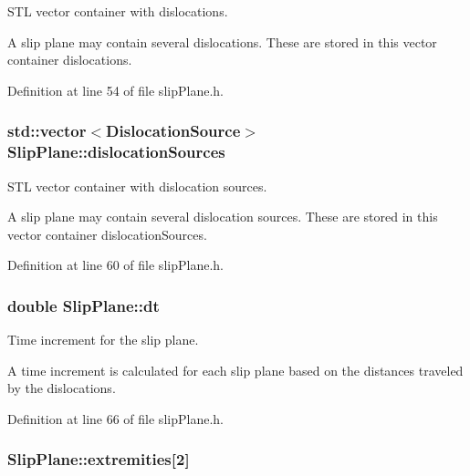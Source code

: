 S\-T\-L vector container with dislocations. 

A slip plane may contain several dislocations. These are stored in this vector container dislocations. 

Definition at line 54 of file slip\-Plane.\-h.

\hypertarget{classSlipPlane_a8e31e904fc6e68cc7ba70b0b57a278cc}{
\subsubsection[{dislocation\-Sources}]{\setlength{\rightskip}{0pt plus 5cm}std\-::vector$<${\bf Dislocation\-Source}$>$ Slip\-Plane\-::dislocation\-Sources\hspace{0.3cm}{\ttfamily [protected]}}}\label{db/d25/classSlipPlane_a8e31e904fc6e68cc7ba70b0b57a278cc}


S\-T\-L vector container with dislocation sources. 

A slip plane may contain several dislocation sources. These are stored in this vector container dislocation\-Sources. 

Definition at line 60 of file slip\-Plane.\-h.

\hypertarget{classSlipPlane_ad786135547799363ad2931e43522c2be}{
\subsubsection[{dt}]{\setlength{\rightskip}{0pt plus 5cm}double Slip\-Plane\-::dt\hspace{0.3cm}{\ttfamily [protected]}}}\label{db/d25/classSlipPlane_ad786135547799363ad2931e43522c2be}


Time increment for the slip plane. 

A time increment is calculated for each slip plane based on the distances traveled by the dislocations. 

Definition at line 66 of file slip\-Plane.\-h.

\hypertarget{classSlipPlane_abbdbe6ed805faf3777b54ff55a9c089c}{
\subsubsection[{extremities}]{ Slip\-Plane\-::extremities\mbox{[}2\mbox{]}\hspace{0.3cm}{\ttfamily [protected]}}}\label{db/d25/classSlipPlane_abbdbe6ed805faf3777b54ff55a9c089c}


